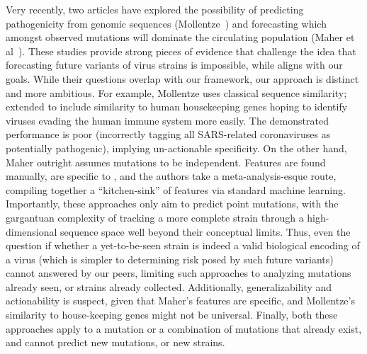 \documentclass[onecolumn, compsoc,10pt]{IEEEtran}
\begin{document}
Very recently, two articles have explored the possibility of predicting  pathogenicity from genomic sequences (Mollentze~\cite{mollentze2021identifying}) and forecasting which amongst observed mutations will dominate the circulating population (Maher et al~\cite{maher2021predicting}). These studies provide strong pieces of evidence that challenge the idea that forecasting future variants of virus strains is impossible, while aligns with our goals. While their questions overlap with our framework, our approach is distinct and more ambitious. For example,  Mollentze  uses  classical  sequence similarity; extended to include similarity to  human housekeeping genes hoping to identify viruses  evading the human immune system more easily.  The demonstrated  performance is poor (incorrectly tagging all SARS-related coronaviruses as potentially pathogenic), implying un-actionable specificity. On the other hand,  Maher outright assumes mutations to be independent. Features are found manually,  are specific to \hcov, and the authors take  a meta-analysis-esque route, compiling together a ``kitchen-sink'' of features via standard machine learning. Importantly, these approaches  only aim to predict point mutations, with  the gargantuan complexity of tracking a more complete strain through a high-dimensional sequence space well beyond their conceptual limits. Thus, even the question if whether a yet-to-be-seen strain is indeed a valid biological encoding of a virus (which is simpler to determining risk posed by such future variants) cannot answered by our peers, limiting such approaches to analyzing mutations already seen, or strains  already collected.  Additionally, generalizability and actionability is  suspect, given that Maher's features are \hcov specific, and Mollentze's similarity to house-keeping genes might not be universal. Finally, both these  approaches apply to a mutation or a combination of mutations that already exist, and cannot predict new mutations, or new strains.
\end{document}
